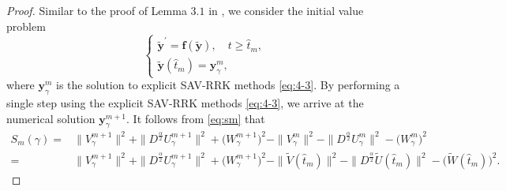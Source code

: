 \documentclass[preprint,compress,3p,10pt,fleqn]{elsarticle}
\numberwithin{equation}{section}
\begin{document}
\begin{proof}
Similar to the proof of Lemma $3.1$ in \cite{liImplicitexplicitRelaxationRungeKutta2022}, we consider the initial value problem
\begin{equation}
\left\{\begin{array}{l}
\tilde{\bm{y}}^{\prime}=\bm{f}(\tilde{\bm{y}}), \quad t \geq \hat{t}_m, \\
\tilde{\bm{y}}\left(\hat{t}_m\right)=\bm{y}_\gamma^m,
\end{array}\right.
\end{equation}
where $\bm{y}_\gamma^m$ is the solution to explicit SAV-RRK methods \eqref{eq:4-3}. By performing a single step using the explicit SAV-RRK methods \eqref{eq:4-3}, we arrive at the numerical solution $\bm{y}_\gamma^{m+1}$. It follows from \eqref{eq:sm} that
\begin{equation}
\begin{aligned}
S_m(\gamma) =& \|V_\gamma^{m+1}\|^2 + \|D^\frac{\alpha}{2} U_\gamma^{m+1}\|^2+\big(W_\gamma^{m+1}\big)^2-\|V_\gamma^{m}\|^2 - \|D^\frac{\alpha}{2} U_\gamma^{m}\|^2-\big(W_\gamma^{m}\big)^2\\
=& \|V_\gamma^{m+1}\|^2 + \|D^\frac{\alpha}{2} U_\gamma^{m+1}\|^2+\big(W_\gamma^{m+1}\big)^2-\|\tilde{V}(\hat{t}_{m})\|^2 - \|D^\frac{\alpha}{2} \tilde{U}(\hat{t}_{m})\|^2-\big(\tilde{W}(\hat{t}_{m})\big)^2.
\end{aligned}
\end{equation}


\end{proof}
\end{document}

